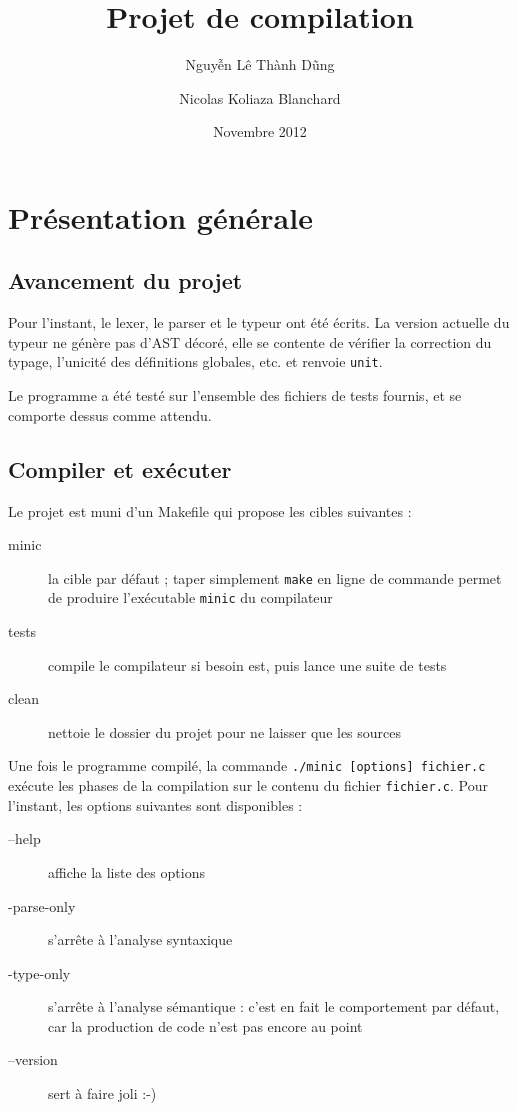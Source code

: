 \documentclass[a4paper, 11pt]{article}
\begin{document}
 
\title{Projet de compilation}
\author{Nguy\~{\^e}n Lê Thành D\~ung \and Nicolas Koliaza Blanchard}
\date{Novembre 2012}
\maketitle

\section{Présentation générale}

\subsection{Avancement du projet}

Pour l'instant, le lexer, le parser et le typeur ont été écrits. La version
actuelle du typeur ne génère pas d'AST décoré, elle se contente de vérifier
la correction du typage, l'unicité des définitions globales, etc. et renvoie
\texttt{unit}.

Le programme a été testé sur l'ensemble des fichiers de tests fournis, et
se comporte dessus comme attendu.

\subsection{Compiler et exécuter}

Le projet est muni d'un Makefile qui propose les cibles suivantes :
\begin{description}
\item[minic] la cible par défaut ; taper simplement \texttt{make} en ligne
  de commande permet de produire l'exécutable \texttt{minic} du compilateur
\item[tests] compile le compilateur si besoin est, puis lance une suite de tests
\item[clean] nettoie le dossier du projet pour ne laisser que les sources
\end{description}

Une fois le programme compilé, la commande \texttt{./minic [options] fichier.c}
exécute les phases de la compilation sur le contenu du fichier \texttt{fichier.c}.
Pour l'instant, les options suivantes sont disponibles :
\begin{description}
\item[--help] affiche la liste des options
\item[-parse-only] s'arrête à l'analyse syntaxique
\item[-type-only] s'arrête à l'analyse sémantique : c'est en fait le comportement
  par défaut, car la production de code n'est pas encore au point
\item[--version] sert à faire joli :-)
\end{description}
\end{document}
